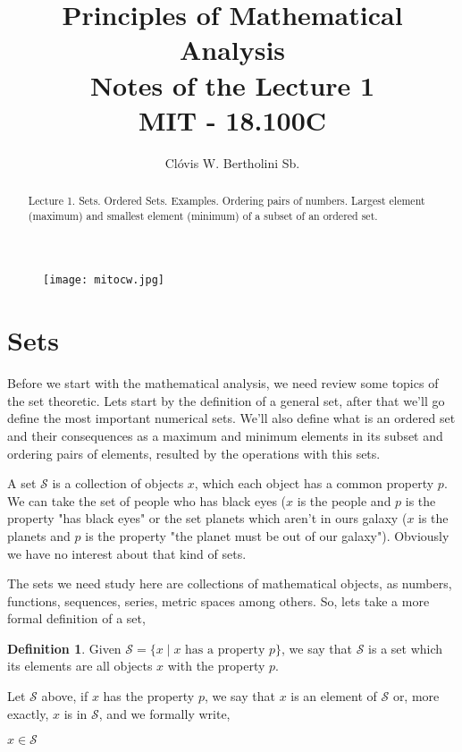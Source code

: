 \documentclass[11pt, a4paper]{amsart}
\title{Principles of Mathematical Analysis\\Notes of the Lecture 1\\MIT - 18.100C}
\author{Clóvis W. Bertholini Sb.}
\numberwithin{equation}{section}
\theoremstyle{plain} %
\theoremstyle{definition}
\newtheorem{defn}{Definition}[section]
\theoremstyle{remark}
\begin{document}
\begin{figure}[h]
\texttt{[image: mitocw.jpg]}
\end{figure}

\maketitle

\begin{abstract}
Lecture 1. Sets. Ordered Sets. Examples. Ordering pairs of numbers. Largest element (maximum) and smallest element (minimum) of a subset of an ordered set.
\end{abstract}

\section{Sets}
Before we start with the mathematical analysis, we need review some topics of the set theoretic. Lets start by the definition of a general set, after that we'll go define the most important numerical sets. We'll also define what is an ordered set and their consequences as a maximum and minimum elements in its subset and ordering pairs of elements, resulted by the operations with this sets.

A set $\mathcal{S}$ is a collection of objects $x$, which each object has a common property $p$. 
We can take the set of people who has black eyes ($x$ is the people and $p$ is the property "has black eyes" or the set planets which aren't in ours galaxy ($x$ is the planets and $p$ is the property "the planet must be out of our galaxy"). Obviously we have no interest about that kind of sets.

The sets we need study here are collections of mathematical objects, as numbers, functions, sequences, series, metric spaces among others. So, lets take a more formal definition of a set,

\begin{defn}
    Given $\mathcal{S}=\lbrace x\mid x \text{ has a property } p\rbrace$, we say that $\mathcal{S}$ is a set which its elements are all objects $x$ with the property $p$.
\end{defn}

Let $\mathcal{S}$ above, if $x$ has the property $p$, we say that $x$ is an element of $\mathcal{S}$ or, more exactly, $x$ is in $\mathcal{S}$, and we formally write,
\begin{center}
    $x\in\mathcal{S}$
\end{center}
\end{document}
